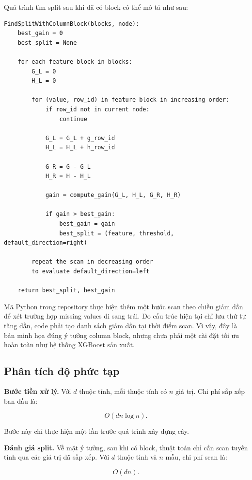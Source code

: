 Quá trình tìm split sau khi đã có block có thể mô tả như sau:

\begin{lstlisting}[style=pseudocode, caption={Scan split candidates trên Column Block}, label={lst:scan_column_block}]
FindSplitWithColumnBlock(blocks, node):
    best_gain = 0
    best_split = None

    for each feature block in blocks:
        G_L = 0
        H_L = 0

        for (value, row_id) in feature block in increasing order:
            if row_id not in current node:
                continue

            G_L = G_L + g_row_id
            H_L = H_L + h_row_id

            G_R = G - G_L
            H_R = H - H_L

            gain = compute_gain(G_L, H_L, G_R, H_R)

            if gain > best_gain:
                best_gain = gain
                best_split = (feature, threshold, default_direction=right)

        repeat the scan in decreasing order
        to evaluate default_direction=left

    return best_split, best_gain
\end{lstlisting}

Mã Python trong repository thực hiện thêm một bước scan theo chiều giảm dần để xét trường hợp missing values đi sang trái. Do cấu trúc hiện tại chỉ lưu thứ tự tăng dần, code phải tạo danh sách giảm dần tại thời điểm scan. Vì vậy, đây là bản minh họa đúng ý tưởng column block, nhưng chưa phải một cài đặt tối ưu hoàn toàn như hệ thống XGBoost sản xuất.

\subsection{Phân tích độ phức tạp}

\textbf{Bước tiền xử lý.} Với $d$ thuộc tính, mỗi thuộc tính có $n$ giá trị. Chi phí sắp xếp ban đầu là:

\[
O(dn\log n).
\]

Bước này chỉ thực hiện một lần trước quá trình xây dựng cây.

\textbf{Đánh giá split.} Về mặt ý tưởng, sau khi có block, thuật toán chỉ cần scan tuyến tính qua các giá trị đã sắp xếp. Với $d$ thuộc tính và $n$ mẫu, chi phí scan là:

\[
O(dn).
\]

